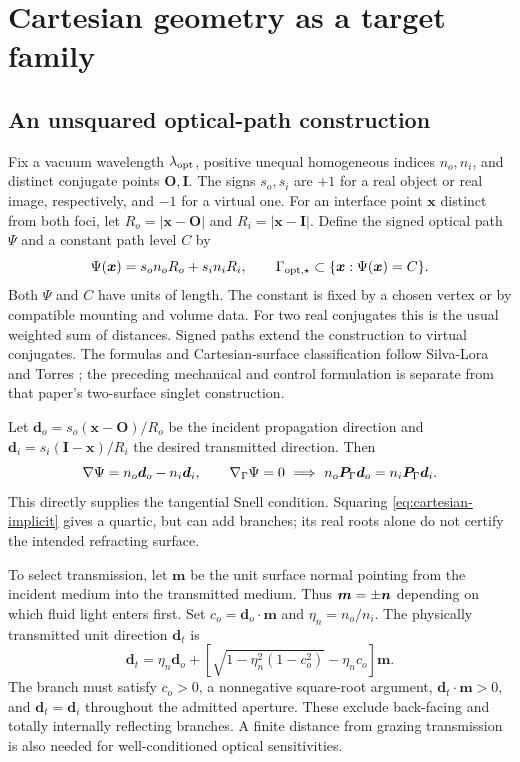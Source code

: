 \section{Cartesian geometry as a target family}\label{sec:optics}

\subsection{An unsquared optical-path construction}
Fix a vacuum wavelength $\lambda_{\rm opt}$, positive unequal homogeneous indices
$n_o,n_i$, and distinct conjugate points $\bm O,\bm I$. The signs $s_o,s_i$ are
$+1$ for a real object or real image, respectively, and $-1$ for a virtual one.
For an interface point $\bm x$ distinct from both foci, let
$R_o=|\bm x-\bm O|$ and $R_i=|\bm x-\bm I|$. Define the signed optical path
$\Psi$ and a constant path level $C$ by
\begin{equation}
 \Psi(\bm x)=s_o n_oR_o+s_i n_iR_i,\qquad
 \Gamma_{\rm opt,\star}\subset\{\bm x:\Psi(\bm x)=C\}.
 \label{eq:cartesian-implicit}
\end{equation}
Both $\Psi$ and $C$ have units of length. The constant is fixed by a chosen
vertex or by compatible mounting and volume data. For two real conjugates this
is the usual weighted sum of distances. Signed paths extend the construction to
virtual conjugates. The formulas and Cartesian-surface classification follow
Silva-Lora and Torres \cite{silva2020}; the preceding mechanical and control formulation is separate from that paper's two-surface singlet construction.

Let $\bm d_o=s_o(\bm x-\bm O)/R_o$ be the incident propagation direction and
$\bm d_i=s_i(\bm I-\bm x)/R_i$ the desired transmitted direction. Then
\begin{equation}
 \nabla\Psi=n_o\bm d_o-n_i\bm d_i,\qquad
 \nabla_\Gamma\Psi=0\ \Longrightarrow\ n_o\bm P_\Gamma\bm d_o=n_i\bm P_\Gamma\bm d_i.
 \label{eq:fermat-snell}
\end{equation}
This directly supplies the tangential Snell condition. Squaring
\cref{eq:cartesian-implicit} gives a quartic, but can add branches; its real
roots alone do not certify the intended refracting surface.

To select transmission, let $\bm m$ be the unit surface normal pointing from the
incident medium into the transmitted medium. Thus $\bm m=\pm\bm n$ depending on
which fluid light enters first. Set $c_o=\bm d_o\cdot\bm m$ and
$\eta_n=n_o/n_i$. The physically transmitted unit direction $\bm d_t$ is
\begin{equation}
 \bm d_t=\eta_n\bm d_o+
 \left[\sqrt{1-\eta_n^2(1-c_o^2)}-\eta_n c_o\right]\bm m.
 \label{eq:snell-vector}
\end{equation}
The branch must satisfy $c_o>0$, a nonnegative square-root argument,
$\bm d_t\cdot\bm m>0$, and $\bm d_t=\bm d_i$ throughout the admitted aperture.
These exclude back-facing and totally internally reflecting branches. A finite
distance from grazing transmission is also needed for well-conditioned optical
sensitivities.

